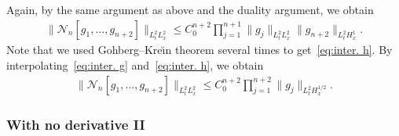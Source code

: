\documentclass[10pt,a4paper]{amsart}
\newcommand{\CN}{\mathcal{N}}
\begin{document}
Again, by the same argument as above and the duality argument, we obtain
\begin{align}\label{eq:inter. h}
\|\CN_n[g_1,\dots,g_{n+2}]\|_{L^2_t L^2_x}
\le C_0^{n+2} \prod_{j=1}^{n+1} \|g_j\|_{L^2_t L^2_x} \|g_{n+2}\|_{L^2_t H^1_x}.
\end{align}
Note that we used Gohberg--Kre\u{\i}n theorem several times to get~\eqref{eq:inter. h}. By interpolating~\eqref{eq:inter. g} and~\eqref{eq:inter. h}, we obtain
\begin{align}\label{eq:no deriv}
\|\CN_n[g_1,\dots,g_{n+2}]\|_{L^2_t L^2_x} \le C_0^{n+2} \prod_{j=1}^{n+2} \|g_j\|_{L^2_t H^{1/2}_x}.
\end{align}

\subsubsection{With no derivative II}
\end{document}
